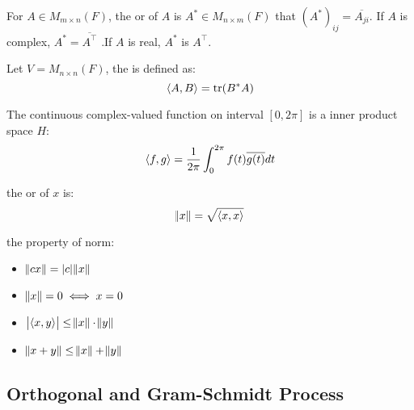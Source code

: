 \begin{definition}
	For $A \in M_{m \times n}(F)$, the  or  of $A$ is $A^* \in M_{n \times m}(F)$ that $(A^*)_{ij} = \overline{A_{ji}}$. If $A$ is complex, $A^* = \overline{A^\top}$ .If $A$ is real, $A^*$ is $A^\top$.
\end{definition}

\begin{definition}
    Let $V=M_{n \times n} (F)$, the  is defined as:
    \begin{equation}
        \left\langle \displaystyle A, B \right\rangle = \text{tr}(B^* A)
    \end{equation}
\end{definition}

\begin{definition}\label{hinnerproductspace}
	The continuous complex-valued function on interval $[0, 2\pi]$ is a inner product space $H$:
	\begin{equation}
		\left\langle \displaystyle f, g \right\rangle = \frac{1}{2\pi} \int_{0}^{2\pi} f(t) \overline{g(t)} dt
	\end{equation}
\end{definition}


\begin{definition}
	the  or  of $x$ is:
	\begin{equation}
	    \norm{x} = \sqrt{\left\langle \displaystyle x, x \right\rangle}
	\end{equation}
\end{definition}

\begin{theorem}
	the property of norm:
	\begin{itemize}
		\item $\norm{cx} = \displaystyle \left\lvert c \right\rvert \norm{x}$
		\item $\norm{x} = 0 \iff x = 0$
		\item {} $\displaystyle \left\lvert \left\langle \displaystyle x, y \right\rangle \right\rvert \leq \norm{x} \cdot \norm{y}$
		\item {} $\norm{x+y} \leq \norm{x} + \norm{y}$
	\end{itemize}
\end{theorem}







\subsection{Orthogonal and Gram-Schmidt Process}


